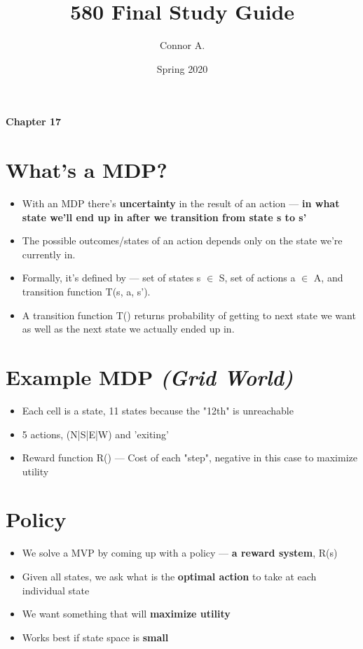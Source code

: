 \documentclass{article}
\title{580 Final Study Guide}
\author{Connor A.}
\date{Spring 2020}
\begin{document}
\maketitle
\huge
\textbf{Chapter 17}

\normalsize
\section{What's a MDP?}
\begin{itemize}
  \item With an MDP there's \textbf{uncertainty} in the result of an action --- \textbf{in what state we'll end up in after we transition from state s to s'}
  \item The possible outcomes/states of an action depends only on the state we're currently in.
  \item Formally, it's defined by --- set of states s $\in$ S, set of actions a $\in$ A, and transition function T(s, a, s').
  \item A transition function T() returns probability of getting to next state we want as well as the next state we actually ended up in.
\end{itemize}

\section{Example MDP \textit{(Grid World)}}
\begin{itemize}
    \item Each cell is a state, 11 states because the "12th" is unreachable
    \item 5 actions, (N|S|E|W) and 'exiting'
    \item Reward function R() --- Cost of each "step", negative in this case to maximize utility
\end{itemize}

\pagebreak
\section{Policy}
\begin{itemize}
    \item We solve a MVP by coming up with a policy --- \textbf{a reward system}, R(s) 
    \item Given all states, we ask what is the \textbf{optimal action} to take at each individual state
    \item We want something that will \textbf{maximize utility}
    \item Works best if state space is \textbf{small}
\end{itemize}
\end{document}
